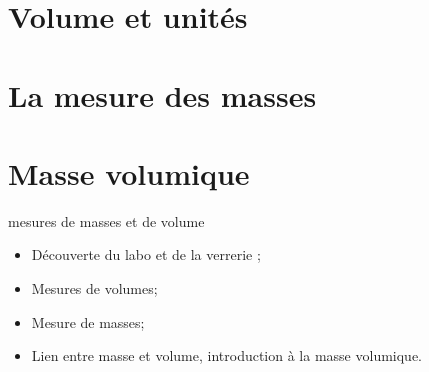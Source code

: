 \documentclass[12pt,a4paper]{article}
\date{}
\title{}
\begin{document}
	
	





\section{Volume et unités}








\section{La mesure des masses}






\section{Masse volumique}



\begin{myact}{mesures de masses et de volume}
	
	\begin{itemize}
		\item Découverte du labo et de la verrerie ;
		\item Mesures de volumes; 
		\item Mesure de masses;
		\item Lien entre masse et volume, introduction à la masse volumique.
	\end{itemize}
\end{myact}



\appendix

\newpage
\end{document}
